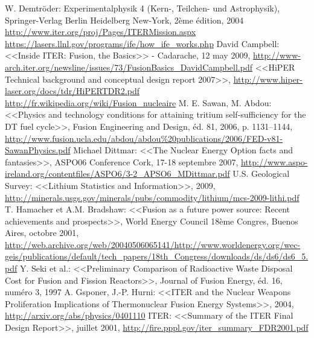 \documentclass[12pt,a4paper]{article}
\begin{document}
\begin{thebibliography}{99}
 W. Demtröder: Experimentalphysik 4 (Kern-, Teilchen- und Astrophysik), Springer-Verlag Berlin Heidelberg New-York, 2ème édition, 2004
 \url{http://www.iter.org/proj/Pages/ITERMission.aspx}
 \url{https://lasers.llnl.gov/programs/ife/how_ife_works.php}
 David Campbell: <<Inside ITER: Fusion, the Basics>> - Cadarache, 12 may 2009, \url{http://www-arch.iter.org/newsline/issues/73/FusionBasics_DavidCampbell.pdf}
 <<HiPER Technical background and conceptual design report 2007>>, \url{http://www.hiper-laser.org/docs/tdr/HiPERTDR2.pdf}
 \url{http://fr.wikipedia.org/wiki/Fusion_nucleaire}
 M. E. Sawan, M. Abdou: <<Physics and technology conditions for attaining tritium self-sufficiency for the DT fuel cycle>>, Fusion Engineering and Design, éd. 81, 2006, p. 1131–1144, \url{http://www.fusion.ucla.edu/abdou/abdou\%20publications/2006/FED-v81-SawanPhysics.pdf}
 Michael Dittmar: <<The Nuclear Energy Option facts and fantasies>>, ASPO06 Conference Cork, 17-18 septembre 2007, \url{http://www.aspo-ireland.org/contentfiles/ASPO6/3-2_APSO6_MDittmar.pdf}
 U.S. Geological Survey: <<Lithium Statistics and Information>>, 2009, \url{http://minerals.usgs.gov/minerals/pubs/commodity/lithium/mcs-2009-lithi.pdf}
 T. Hamacher et A.M. Bradshaw: <<Fusion as a future power source: Recent achievements and prospects>>, World Energy Council 18ème Congres, Buenos Aires, octobre 2001, \url{http://web.archive.org/web/20040506065141/http://www.worldenergy.org/wec-geis/publications/default/tech_papers/18th_Congress/downloads/ds/ds6/ds6_5.pdf}
 Y. Seki et al.: <<Preliminary Comparison of Radioactive Waste Disposal Cost
for Fusion and Fission Reactors>>, Journal of Fusion Energy, éd. 16, numéro 3, 1997
 A. Gsponer, J.-P.
Hurni: <<ITER and the Nuclear Weapons Proliferation Implications
of Thermonuclear Fusion
Energy Systems>>, 2004, \url{http://arxiv.org/abs/physics/0401110}
 ITER: <<Summary of the
ITER
Final Design Report>>, juillet 2001, \url{http://fire.pppl.gov/iter_summary_FDR2001.pdf}

\end{thebibliography}
\end{document}

